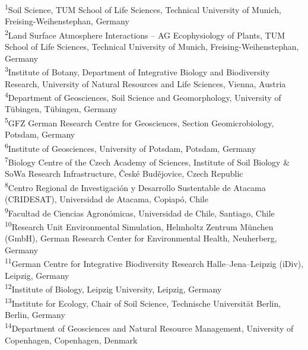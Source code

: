   \begin{scriptsize}
    \begin{justify}
        \textsuperscript{1}Soil Science, TUM School of Life Sciences, Technical University of Munich, Freising-Weihenstephan, Germany\\
        \textsuperscript{2}Land Surface Atmosphere Interactions -- AG Ecophysiology of Plants, TUM School of Life Sciences, Technical University of Munich, Freising-Weihenstephan, Germany\\
        \textsuperscript{3}Institute of Botany, Department of Integrative Biology and Biodiversity Research, University of Natural Resources and Life Sciences, Vienna, Austria\\
        \textsuperscript{4}Department of Geosciences, Soil Science and Geomorphology, University of T\"ubingen, T\"ubingen, Germany\\
        \textsuperscript{5}GFZ German Research Centre for Geosciences, Section Geomicrobiology, Potsdam, Germany\\
        \textsuperscript{6}Institute of Geosciences, University of Potsdam, Potsdam, Germany\\
        \textsuperscript{7}Biology Centre of the Czech Academy of Sciences, Institute of Soil Biology \& SoWa Research Infrastructure, \v{C}esk\'{e} Bud\v{e}jovice, Czech Republic\\
        \textsuperscript{8}Centro Regional de Investigaci\'{o}n y Desarrollo Sustentable de Atacama (CRIDESAT), Universidad de Atacama, Copiap\'{o}, Chile\\
        \textsuperscript{9}Facultad de Ciencias Agron\'{o}micas, Universidad de Chile, Santiago, Chile\\
        \textsuperscript{10}Research Unit Environmental Simulation, Helmholtz Zentrum M\"unchen (GmbH), German Research Center for Environmental Health, Neuherberg, Germany\\
        \textsuperscript{11}German Centre for Integrative Biodiversity Research Halle--Jena--Leipzig (iDiv), Leipzig, Germany\\
        \textsuperscript{12}Institute of Biology, Leipzig University, Leipzig, Germany\\
        \textsuperscript{13}Institute for Ecology, Chair of Soil Science, Technische Universit\"at Berlin, Berlin, Germany\\
        \textsuperscript{14}Department of Geosciences and Natural Resource Management, University of Copenhagen, Copenhagen, Denmark
    \end{justify}
  \end{scriptsize}
    
